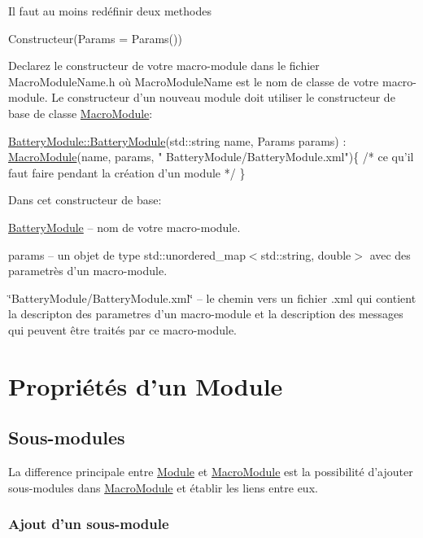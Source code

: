 Il faut au moins redéfinir deux methodes
\begin{DoxyItemize}
\item {\ttfamily Constructeur(Params = Params())}

Declarez le constructeur de votre macro-\/module dans le fichier Macro\-Module\-Name.\-h où Macro\-Module\-Name est le nom de classe de votre macro-\/module. Le constructeur d'un nouveau module doit utiliser le constructeur de base de classe \hyperlink{classMacroModule}{Macro\-Module}\-:


\begin{DoxyCode}
\hyperlink{classBatteryModule_a2fb494ef5f124c38c0fdf9ccfb31918f}{BatteryModule::BatteryModule}(std::string name, 
      Params params) : \hyperlink{classMacroModule}{MacroModule}(name, params, \textcolor{stringliteral}{"
      BatteryModule/BatteryModule.xml"})\{
    \textcolor{comment}{/* ce qu'il faut faire pendant la création d'un module */}
\}
\end{DoxyCode}


Dans cet constructeur de base\-:
\begin{DoxyEnumerate}
\item \hyperlink{classBatteryModule}{Battery\-Module} – nom de votre macro-\/module.
\item params – un objet de type {\ttfamily std\-::unordered\-\_\-map$<$std\-::string, double$>$} avec des parametrès d'un macro-\/module.
\item \char`\"{}\-Battery\-Module/\-Battery\-Module.\-xml\char`\"{} – le chemin vers un fichier {\ttfamily .xml} qui contient la descripton des parametres d'un macro-\/module et la description des messages qui peuvent être traités par ce macro-\/module.
\end{DoxyEnumerate}
\end{DoxyItemize}\hypertarget{R_xC3_xA9f_xC3_xA9rence_properties}{}\section{Propriétés d'un Module}\label{R_xC3_xA9f_xC3_xA9rence_properties}
\hypertarget{R_xC3_xA9f_xC3_xA9rence_submodules}{}\subsection{Sous-\/modules}\label{R_xC3_xA9f_xC3_xA9rence_submodules}
La difference principale entre \hyperlink{classModule}{Module} et \hyperlink{classMacroModule}{Macro\-Module} est la possibilité d'ajouter sous-\/modules dans \hyperlink{classMacroModule}{Macro\-Module} et établir les liens entre eux. \hypertarget{R_xC3_xA9f_xC3_xA9rence_addsubmodule}{}\subsubsection{Ajout d'un sous-\/module}\label{R_xC3_xA9f_xC3_xA9rence_addsubmodule}

